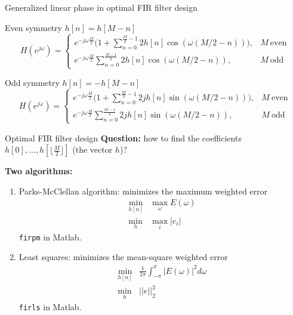 \documentclass[10pt, handout]{beamer}
\begin{document}
\begin{frame}{Generalized linear phase in optimal FIR filter design}
	
	\begin{block}{Even symmetry $h[n] = h[M-n]$}
		\vspace{-0.5cm}
		\begin{equation*}
		H(e^{j\omega}) = \begin{cases}
		e^{-j\omega\frac{M}{2}}\bigg(1 + \displaystyle\sum_{n = 0}^{\frac{M}{2}-1}2h[n]\cos(\omega(M/2-n))\bigg), & M~\text{even} \\
		e^{-j\omega\frac{M}{2}}\displaystyle\sum_{n = 0}^{\frac{M-1}{2}}2h[n]\cos(\omega(M/2-n)), & M~\text{odd} 
		\end{cases}
		\end{equation*}
	\end{block}
	\vspace{-0.25cm}
	\begin{block}{Odd symmetry $h[n] = -h[M-n]$}
		\vspace{-0.5cm}
		\begin{equation*}
		H(e^{j\omega}) = \begin{cases}
		e^{-j\omega \frac{M}{2}}\bigg(1 + \displaystyle\sum_{n = 0}^{\frac{M}{2}-1}2jh[n]\sin(\omega(M/2-n))\bigg), & M~\text{even} \\
		e^{-j\omega \frac{M}{2}}\displaystyle\sum_{n = 0}^{\frac{M-1}{2}}2jh[n]\sin(\omega(M/2-n)), & M~\text{odd} 
		\end{cases}
		\end{equation*}
	\end{block}
\end{frame}


\begin{frame}{Optimal FIR filter design}
	\textbf{Question:} how to find the coefficients $h[0], \ldots, h[\lfloor\frac{M}{2}\rfloor]$ (the vector $h$)?
	\vspace{0.25cm}
	
	\textbf{Two algorithms:}
	\begin{enumerate}
		\item Parks-McClellan algorithm: minimizes the maximum weighted error 
		\begin{align*}
		\min_{h[n]} &\max_\omega E(\omega) \tag{min-max problem} \\
		\min_{h} &\max_i |e_i| \tag{in matrix notation}
		\end{align*}
		\texttt{firpm} in Matlab.
		\item Least squares: minimizes the mean-square weighted error 
		\begin{align*}
		\min_{h[n]} &\frac{1}{2\pi}\int_{-\pi}^{\pi} |E(\omega)|^2d\omega \tag{least squares}\\
		\min_{h} &||e||_2^2 \tag{in matrix notation}
		\end{align*}
		\texttt{firls} in Matlab.
	\end{enumerate}
\end{frame}
\end{document}
